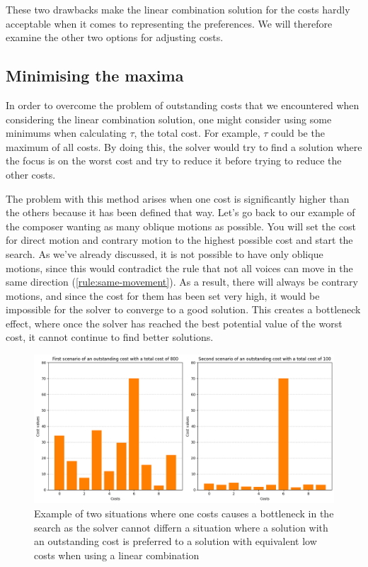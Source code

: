 These two drawbacks make the linear combination solution for the costs hardly acceptable when it comes to representing the preferences.
We will therefore examine the other two options for adjusting costs.

\subsection {Minimising the maxima}
In order to overcome the problem of outstanding costs that we encountered when considering the linear combination solution, one might consider using some minimums when calculating $\tau$, the total cost. For example, $\tau$ could be the maximum of all costs. By doing this, the solver would try to find a solution where the focus is on the worst cost and try to reduce it before trying to reduce the other costs.

The problem with this method arises when one cost is significantly higher than the others because it has been defined that way. Let's go back to our example of the composer wanting as many oblique motions as possible. You will set the cost for direct motion and contrary motion to the highest possible cost and start the search. As we've already discussed, it is not possible to have only oblique motions, since this would contradict the rule that not all voices can move in the same direction (\ref{rule:same-movement}). As a result, there will always be contrary motions, and since the cost for them has been set very high, it would be impossible for the solver to converge to a good solution. This creates a bottleneck effect, where once the solver has reached the best potential value of the worst cost, it cannot continue to find better solutions. 

\begin{figure}[h]
    \centering
    \includegraphics[width=1\textwidth]{Images/minimising-maxima.png}
    \caption{Example of two situations where one costs causes a bottleneck in the search as the solver cannot differn a situation where a solution with an outstanding cost is preferred to a solution with equivalent low costs when using a linear combination}
    \label{fig:outstanding-cost}
\end{figure}



